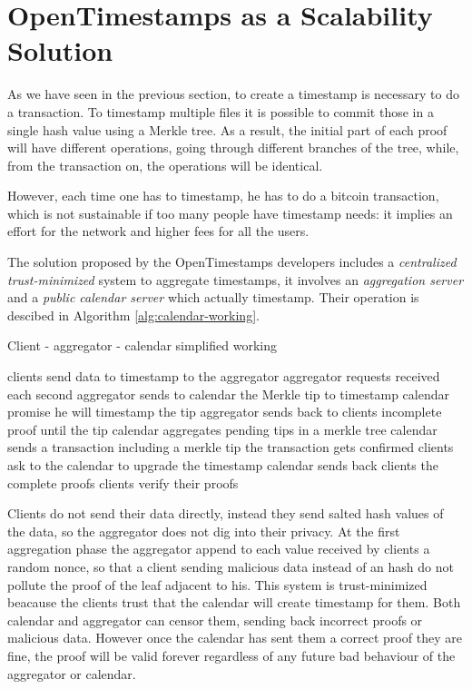 \section{OpenTimestamps as a Scalability Solution}
As we have seen in the previous section, to create a timestamp is necessary to do a transaction. 
To timestamp multiple files it is possible to commit those in a single hash value using a Merkle tree. As a result, the initial part of each proof will have different operations, going through different branches of the tree, while, from the transaction on, the operations will be identical.

However, each time one has to timestamp, he has to do a bitcoin transaction, which is not sustainable if too many people have timestamp needs: it implies an effort for the network and higher fees for all the users.

The solution proposed by the OpenTimestamps developers includes a \textit{centralized trust-minimized} system to aggregate timestamps, it involves an \textit{aggregation server} and a \textit{public calendar server} which actually timestamp.
Their operation is descibed in Algorithm \ref{alg:calendar-working}.

\begin{algorithm}
	\caption{Client - aggregator - calendar simplified working}
	\label{alg:calendar-working}
	\begin{algorithmic}[1]
		\State clients send data to timestamp to the aggregator
		\State aggregator  requests received each second
		\State aggregator sends to calendar the Merkle tip to timestamp
		\State calendar promise he will timestamp the tip
		\State aggregator sends back to clients incomplete proof until the tip
		\State calendar aggregates pending tips in a merkle tree
		\State calendar sends a transaction including a merkle tip
		\State the transaction gets confirmed\footnotemark {}
		\State clients ask to the calendar to upgrade the timestamp
		\State calendar sends back clients the complete proofs
		\State clients verify their proofs
	\end{algorithmic}	
\end{algorithm}

Clients do not send their data directly, instead they send salted hash values of the data, so the aggregator does not dig into their privacy.
At the first aggregation phase the aggregator append to each value received by clients a random nonce, so that a client sending malicious data instead of an hash do not pollute the proof of the leaf adjacent to his.
This system is trust-minimized beacause the clients trust that the calendar will create timestamp for them. Both calendar and aggregator can censor them, sending back incorrect proofs or malicious data. However once the calendar has sent them a correct proof they are fine, the proof will be valid forever regardless of any future bad behaviour of the aggregator or calendar.


